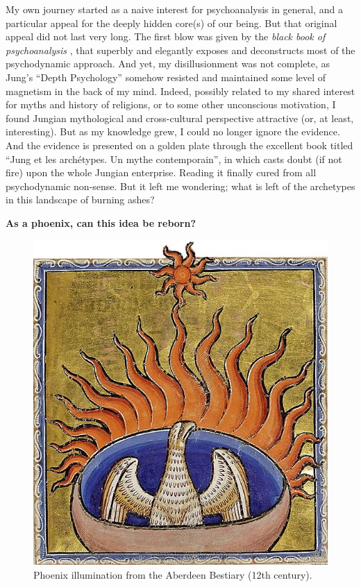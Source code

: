 \documentclass[
]{book}
\begin{document}
My own journey started as a naive interest for psychoanalysis in general, and a particular appeal for the deeply hidden core(s) of our being. But that original appeal did not last very long. The first blow was given by the \emph{black book of psychoanalysis} \citep[``Le livre noir de la psychanalyse'';][]{borch2005livre}, that superbly and elegantly exposes and deconstructs most of the psychodynamic approach. And yet, my disillusionment was not complete, as Jung's ``Depth Psychology'' somehow resisted and maintained some level of magnetism in the back of my mind. Indeed, possibly related to my shared interest for myths and history of religions, or to some other unconscious motivation, I found Jungian mythological and cross-cultural perspective attractive (or, at least, interesting). But as my knowledge grew, I could no longer ignore the evidence. And the evidence is presented on a golden plate through the excellent book titled ``Jung et les archétypes. Un mythe contemporain'', in which \citet{lequellec2013jung} casts doubt (if not fire) upon the whole Jungian enterprise. Reading it finally cured from all psychodynamic non-sense. But it left me wondering; what is left of the archetypes in this landscape of burning ashes?

\textbf{As a phoenix, can this idea be reborn?}

\begin{figure}

{\centering \includegraphics[width=\textwidth]{img/phoenix_aberdeen_bestiary} 

}

\caption{Phoenix illumination from the Aberdeen Bestiary (12th century).}\label{fig:unnamed-chunk-3}
\end{figure}
\end{document}
